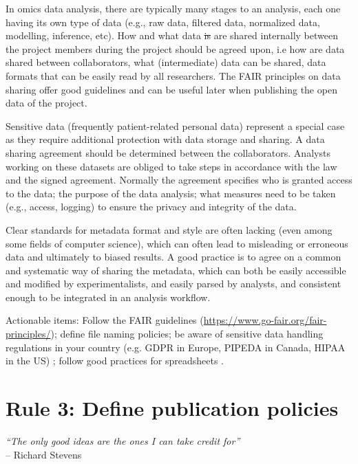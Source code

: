 \documentclass{article}
\begin{document}
In omics data analysis, there are typically many stages to an analysis, each one having its own type of data (e.g., raw data, filtered data, normalized data, modelling, inference, etc). How and what data { \color{red} \sout{is} are} shared internally between the project members during the project should be agreed upon, i.e how are data shared between collaborators, what (intermediate) data can be shared, data formats that can be easily read by all researchers. The FAIR principles \cite{wilkinson2016fair} on data sharing offer good guidelines and can be useful later when publishing the open data of the project.

Sensitive data (frequently patient-related personal data) represent a special case as they require additional protection with data storage and sharing.  A data sharing agreement should be determined between the collaborators. Analysts working on these datasets are obliged to take steps in accordance with the law and the signed agreement. Normally the agreement specifies who is granted access to the data; the purpose of the data analysis; what measures need to be taken (e.g., access, logging) to ensure the privacy and integrity of the data. 

Clear standards for metadata format and style are often lacking (even among some fields of computer science), which can often lead to misleading or erroneous data and ultimately to biased results. A good practice is to agree on a common and systematic way of sharing the metadata, which can both be easily accessible and modified by experimentalists, and easily parsed by analysts, and consistent enough to be integrated in an analysis workflow.  

Actionable items: Follow the FAIR guidelines (\url{https://www.go-fair.org/fair-principles/}); define file naming policies; be aware of sensitive data handling regulations {\color{red} in your country (e.g.} GDPR in Europe, {\color{red} PIPEDA in Canada, HIPAA in the US}) \cite{shabani2019reidentifiability,party2011advice}; follow good practices for spreadsheets \cite{broman2018data}.

\section*{Rule 3: Define publication policies} %
\label{rule3_publication}

\begin{flushright}
\rightskip=1cm\textit{``The only good ideas are the ones I can take credit for''} \\
\vspace{.2em}
\rightskip=0cm -- Richard Stevens
\end{flushright}
\end{document}
